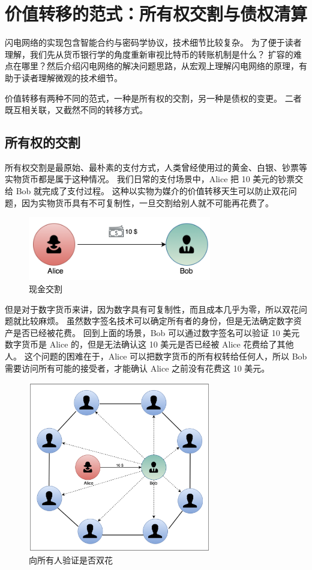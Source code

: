 \section{价值转移的范式：所有权交割与债权清算}
闪电网络的实现包含智能合约与密码学协议，技术细节比较复杂。
为了便于读者理解，我们先从货币银行学的角度重新审视比特币的转账机制是什么？
扩容的难点在哪里？然后介绍闪电网络的解决问题思路，从宏观上理解闪电网络的原理，有助于读者理解微观的技术细节。

价值转移有两种不同的范式，一种是所有权的交割，另一种是债权的变更。
二者既互相关联，又截然不同的转移方式。

\subsection{所有权的交割}
所有权交割是最原始、最朴素的支付方式，人类曾经使用过的黄金、白银、钞票等实物货币都是属于这种情况。
我们日常的支付场景中，Alice 把 10 美元的钞票交给 Bob 就完成了支付过程。
这种以实物为媒介的价值转移天生可以防止双花问题，因为实物货币具有不可复制性，一旦交割给别人就不可能再花费了。

\begin{figure}[h!]
    \centering
	\includegraphics[width=8cm, keepaspectratio]{../images/cash.png}
    \caption{现金交割}
    \label{fig:cash}
\end{figure}

但是对于数字货币来讲，因为数字具有可复制性，而且成本几乎为零，所以双花问题就比较麻烦。
虽然数字签名技术可以确定所有者的身份，但是无法确定数字资产是否已经被花费。
回到上面的场景，Bob 可以通过数字签名可以验证 10 美元数字货币是 Alice 的，但是无法确认这 10 美元是否已经被 Alice 花费给了其他人。
这个问题的困难在于，Alice 可以把数字货币的所有权转给任何人，所以 Bob 需要访问所有可能的接受者，才能确认 Alice 之前没有花费这 10 美元。

\begin{figure}[h!]
    \centering
    \includegraphics[width=8cm, keepaspectratio]{../images/Gossip_1.png}
    \caption{向所有人验证是否双花}
    \label{fig:gossip}
\end{figure}


